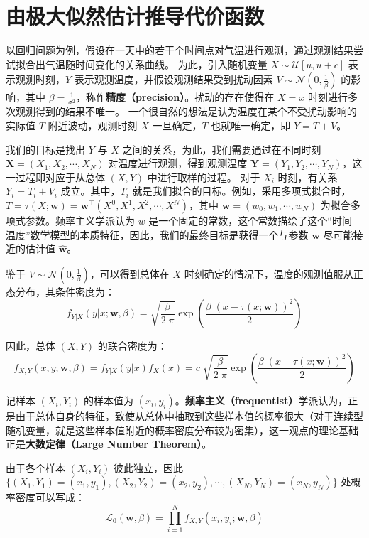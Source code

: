 \documentclass[UTF8, a4paper, oneside]{article}
\begin{document}
\section{由极大似然估计推导代价函数}

以回归问题为例，假设在一天中的若干个时间点对气温进行观测，通过观测结果尝试拟合出气温随时间变化的关系曲线。
为此，引入随机变量 $X \sim \mathcal{U}[u, u + c]$ 表示观测时刻，$Y$ 表示观测温度，并假设观测结果受到扰动因素 $V \sim \mathcal{N}(0, \frac{1}{\beta})$ 的影响，其中 $\beta = \frac{1}{\sigma^2}$，称作\textbf{精度（precision）}。扰动的存在使得在 $X = x$ 时刻进行多次观测得到的结果不唯一。
一个很自然的想法是认为温度在某个不受扰动影响的实际值 $T$ 附近波动，观测时刻 $X$ 一旦确定，$T$ 也就唯一确定，即 $Y = T + V$。

我们的目标是找出 $Y$ 与 $X$ 之间的关系，为此，我们需要通过在不同时刻 $\boldsymbol{X} = (X_1, X_2, \cdots, X_N)$ 对温度进行观测，得到观测温度 $\boldsymbol{Y} = (Y_1, Y_2, \cdots, Y_N)$，这一过程即对应于从总体 $(X, Y)$ 中进行取样的过程。
对于 $X_i$ 时刻，有关系 $Y_i = T_i + V_i$ 成立。其中，$T_i$ 就是我们拟合的目标。例如，采用多项式拟合时，$T = \tau(X; \boldsymbol{w}) = \boldsymbol{w}^{\top} (X^0, X^1, X^2, \cdots, X^N)$，其中 $\boldsymbol{w} = (w_0, w_1, \cdots, w_N)$ 为拟合多项式参数。频率主义学派认为 $w$ 是一个固定的常数，这个常数描绘了这个“时间-温度”数学模型的本质特征，因此，我们的最终目标是获得一个与参数 $\boldsymbol{w}$ 尽可能接近的估计值 $\boldsymbol{\hat{w}}$。

鉴于 $V \sim \mathcal{N}(0, \frac{1}{\beta})$，可以得到总体在 $X$ 时刻确定的情况下，温度的观测值服从正态分布，其条件密度为：
$$f_{Y|X}(y|x; \boldsymbol{w}, \beta) = \sqrt{\frac{\beta}{2\;\pi}}\exp\left(\frac{\beta\;\left(x-\tau\left(x;\boldsymbol{w}\right)\right)^2}{2}\right)$$

因此，总体 $(X, Y)$ 的联合密度为：
\begin{equation} \label{jpdf}
f_{X, Y}(x, y; \boldsymbol{w}, \beta) = f_{Y|X}(y|x) f_X(x) = 
c\;\sqrt{\frac{\beta}{2\;\pi}}\exp\left(\frac{\beta\;\left(x-\tau\left(x;\boldsymbol{w}\right)\right)^2}{2}\right)
\end{equation}

记样本 $(X_i, Y_i)$ 的样本值为 $(x_i, y_i)$。\textbf{频率主义（frequentist）}学派认为，正是由于总体自身的特征，致使从总体中抽取到这些样本值的概率很大（对于连续型随机变量，就是这些样本值附近的概率密度分布较为密集），这一观点的理论基础正是\textbf{大数定律（Large Number Theorem）}。

由于各个样本 $(X_i, Y_i)$ 彼此独立，因此 $\{(X_1, Y_1) = (x_1, y_1), (X_2, Y_2) = (x_2, y_2), \cdots, (X_N, Y_N) = (x_N, y_N)\}$ 处概率密度可以写成：
\begin{equation} \label{ml}
\mathcal{L}_0(\boldsymbol{w}, \beta) = \prod_{i = 1}^{N} f_{X, Y}(x_i, y_i; \boldsymbol{w}, \beta)
\end{equation}
\end{document}
